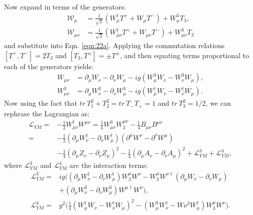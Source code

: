 Now expand in terms of the generators:
\begin{equation}
\begin{split}
\mathcal{W}_\mu &= \frac{1}{\sqrt{2}}(W_\mu^\dagger T^+ + W_\mu T^-) + W_\mu^3 T_3, \\
\mathcal{W}_{\mu \nu} &= \frac{1}{\sqrt{2}}(W_{\mu \nu}^\dagger T^+ + W_{\mu \nu} T^- ) + W_{\mu \nu} ^3 T_3
\end{split}
\end{equation}
and substitute into Eqn. \ref{eqn:22a}. Applying the commutation relations $[T^+, T^-] = 2 T_3$ and $[T_3, T^\pm] = \pm T^\pm$, and then equating terms proportional to each of the generators yields:
\begin{equation}
\begin{split}
W_{\mu \nu} &= \partial_\mu W_\nu - \partial_\nu W_\mu -ig(W_\mu^3 W_\nu - W_\nu^3 W_\mu), \\
W_{\mu \nu}^3 &= \partial_\mu W_\nu^3 - \partial_\nu W_\mu^3 - ig(W_\mu^\dagger W_\nu - W_\nu^\dagger W_\mu).
\end{split}
\end{equation}
Now using the fact that $tr \ T_1^2 + T_2^2 = tr\ T_-T_+ = 1$ and $tr \ T_3^2 = 1/2$, we can rephrase the Lagrangian as:
\begin{equation}
\begin{split}
\mathcal{L}_{YM} = &-\frac{1}{2} W_{\mu \nu}^\dagger W^{\mu \nu} = \frac{1}{4} W_{\mu \nu}^3 W^{\mu \nu}_3 - \frac{1}{4}B_{\mu \nu} B^{\mu \nu} \\
= &- \frac{1}{2}(\partial_\mu W_\nu^\dagger - \partial_\nu W_\mu^\dagger)(\partial^\mu W^\nu - \partial^\nu W^\mu)\\ &- \frac{1}{4}(\partial_\mu Z_\nu - \partial_\nu Z_\mu)^2 - \frac{1}{4}(\partial_\mu A_\nu - \partial_\nu A_\mu)^2 + \mathcal{L}_{YM}^3 + \mathcal{L}_{YM}^4,
\end{split}
\end{equation}
where $\mathcal{L}_{YM}^3$ and $\mathcal{L}_{YM}^4$ are the interaction terms:
\begin{equation}
\begin{split}
\mathcal{L}_{YM}^3 = &ig \bigg( (\partial_\mu W_\nu^\dagger - \partial_\nu W_\mu^\dagger) W_3^\mu W^\nu - W_3^\mu W^{\nu \dagger}(\partial_\mu W_\nu - \partial_\nu W_\mu) \\ &+ (\partial_\mu W_\nu^3 - \partial_\nu W_\mu^3) W^{\mu \dagger} W^\nu \bigg), \\
\mathcal{L}_{YM}^4 = &g^2 \bigg( \frac{1}{4}(W_\mu^\dagger W_\nu - W_\nu^\dagger W_\mu)^2 - (W_\mu^3 W_\nu^\dagger - W\nu^3 W_\mu^\dagger) W_3^\mu W^\nu \bigg).
\end{split}
\end{equation}
